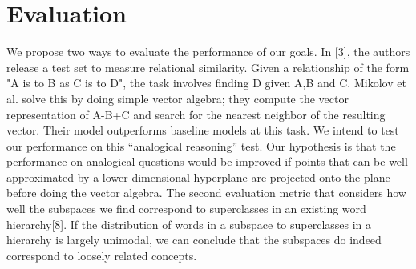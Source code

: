 \section{Evaluation}

We propose two ways to evaluate the performance of our goals. 
In [3], the authors release a test set to measure relational similarity. 
Given a relationship of the form "A is to B as C is to D", the task involves finding D given A,B and C. 
Mikolov et al. 
solve this by doing simple vector algebra; they compute the vector representation of A-B+C and search for the nearest neighbor of the resulting vector. 
Their model outperforms baseline models at this task. 
We intend to test our performance on this “analogical reasoning” test. 
Our hypothesis is that the performance on analogical questions would be improved if points that can be well approximated by a lower dimensional hyperplane are projected onto the plane before doing the vector algebra. 
The second evaluation metric that considers how well the subspaces we find correspond to superclasses in an existing word hierarchy[8]. 
If the distribution of words in a subspace to superclasses in a hierarchy is largely unimodal, we can conclude that the subspaces do indeed correspond to loosely related concepts. 

